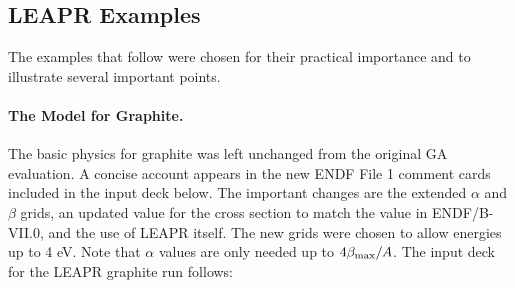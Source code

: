 \subsection{LEAPR Examples}
\label{ssLEAPR_examples}

The examples that follow were chosen for their practical importance
and to illustrate several important points.

\paragraph{The Model for Graphite.}
The basic physics for graphite was left unchanged from the original
GA evaluation\cite{GAreport}.  A concise account appears in the new ENDF
File 1 comment cards included in the input deck below.  The important
changes are the extended $\alpha$ and $\beta$ grids, an updated value
for the cross section to match the value in ENDF/B-VII.0, and the use
of LEAPR itself.  The new grids were chosen to allow energies up
to 4 eV.  Note that $\alpha$ values are only needed up to
$4\beta_{\rm max}/A$.  The input deck for the LEAPR graphite run
follows:

